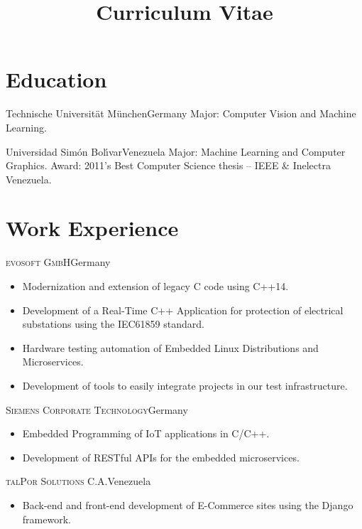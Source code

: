 \documentclass[10pt]{moderncv}
\title{Curriculum Vitae}
\begin{document}
\maketitle

\section{Education}

  {Technische Universit\"at M\"unchen}{Germany}{}{%
    Major: Computer Vision and Machine Learning.
  }

  {Universidad Sim\'on Bol\'{\i}var}{Venezuela}{}{%
    Major: Machine Learning and Computer Graphics.
    \newline
    Award: 2011's Best Computer Science thesis -- IEEE \& Inelectra Venezuela.
  }

\section{Work Experience}

{\textsc{evosoft GmbH}}{Germany}{}{%
\begin{itemize}
    \item Modernization and extension of legacy C code using C++14.
    \item Development of a Real-Time C++ Application for protection of electrical substations using the IEC61859 standard.
    \item Hardware testing automation of Embedded Linux Distributions and Microservices.
    \item Development of tools to easily integrate projects in our test infrastructure.
\end{itemize}
}

{\textsc{Siemens Corporate Technology}}{Germany}{}{%
\begin{itemize}
  \item Embedded Programming of IoT applications in C/C++.
  \item Development of RESTful APIs for the embedded microservices.
\end{itemize}
}

{\textsc{talPor Solutions C.A.}}{Venezuela}{}{%
\begin{itemize}
  \item Back-end and front-end development of E-Commerce sites using the Django framework.
\end{itemize}
}
\end{document}
